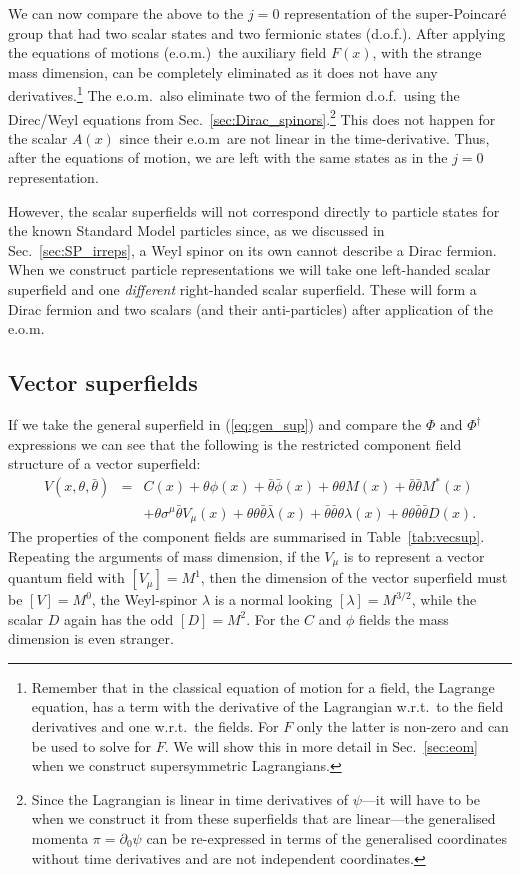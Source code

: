 \documentclass[notes.tex]{subfiles}
\begin{document}
We can now compare the above to the $j=0$ representation of the super-Poincaré group that had two scalar states and two fermionic states (d.o.f.).  After applying the equations of motions (e.o.m.)\ the auxiliary field $F(x)$, with the strange mass dimension, can be completely eliminated as it does not have any derivatives.\footnote{Remember that in the classical equation of motion for a field, the Lagrange equation, has a term with the derivative of the Lagrangian w.r.t.\ to the field derivatives and one w.r.t.\ the fields. For $F$ only the latter is non-zero and can be used to solve for $F$. We will show this in more detail in Sec.~\ref{sec:eom} when we construct supersymmetric Lagrangians.} The e.o.m.\ also eliminate two of the fermion d.o.f.\ using the Direc/Weyl equations from Sec.~\ref{sec:Dirac_spinors}.\footnote{Since the Lagrangian is linear in time derivatives of $\psi$---it will have to be  when we construct it from these superfields that are linear---the generalised momenta $\pi=\partial_0\psi$ can be re-expressed in terms of the generalised coordinates without time derivatives and are not independent coordinates.} 
This does not happen for the scalar $A(x)$ since their e.o.m\ are not linear in the time-derivative. Thus, after the equations of motion, we are left with the same states as in the $j=0$ representation.

However, the scalar superfields will not correspond directly to particle states for the known Standard Model particles since, as we discussed in Sec.~\ref{sec:SP_irreps}, a Weyl spinor on its own cannot describe a Dirac fermion. When we construct particle representations we will take one left-handed scalar superfield and one {\it different} right-handed scalar superfield. These will form a Dirac fermion and two scalars (and their anti-particles) after application of the e.o.m. 

\subsection{Vector superfields}
If we take the general superfield in (\ref{eq:gen_sup}) and compare the $\Phi$ and $\Phi^\dagger$ expressions we can see that the following is the restricted component field structure of a vector superfield:
\begin{eqnarray*}
V(x, \theta, \bar{\theta}) &=& C(x) + \theta\phi(x) + \bar{\theta}\bar{\phi}(x) + \theta\theta M(x) + \bar{\theta}\bar{\theta}M^*(x) \\
&& + \theta \sigma^\mu \bar{\theta}V_\mu(x) + \theta \theta \bar{\theta}\bar{\lambda}(x) +\bar{\theta}\bar{\theta}\theta\lambda(x) + \theta\theta\bar{\theta}\bar{\theta}D(x).
\end{eqnarray*} 
The properties of the component fields  are summarised in Table~\ref{tab:vecsup}. Repeating the arguments of mass dimension, if the $V_\mu$ is to represent a vector quantum field with $[V_\mu]=M^1$, then the dimension of the vector superfield must be $[V]=M^0$, the Weyl-spinor $\lambda$ is a normal looking $[\lambda]=M^{3/2}$, while the scalar $D$ again has the odd $[D]=M^2$. For the $C$ and $\phi$ fields the mass dimension is even stranger.
\end{document}
